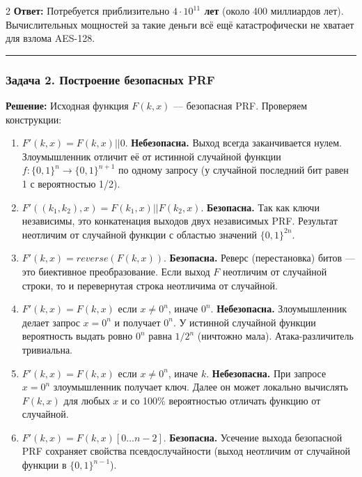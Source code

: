 ﻿\documentclass[10pt,a4paper,landscape]{extarticle}
\newcommand{\tightlist}{}
\begin{document}
\begin{multicols*}{2}
\textbf{Ответ:} Потребуется приблизительно \textbf{\(4 \cdot 10^{11}\) лет} (около 400 миллиардов лет). Вычислительных мощностей за такие деньги всё ещё катастрофически не хватает для взлома AES-128.

\begin{center}\rule{0.5\linewidth}{0.5pt}\end{center}

\subsubsection{Задача 2. Построение безопасных PRF}\label{ux437ux430ux434ux430ux447ux430-2.-ux43fux43eux441ux442ux440ux43eux435ux43dux438ux435-ux431ux435ux437ux43eux43fux430ux441ux43dux44bux445-prf}

\textbf{Решение:} Исходная функция \(F(k, x)\) --- безопасная PRF. Проверяем конструкции:

\begin{enumerate}
\def\labelenumi{\arabic{enumi}.}
\tightlist
\item
  \(F'(k, x) = F(k, x) || 0\). \textbf{Небезопасна.} Выход всегда заканчивается нулем. Злоумышленник отличит её от истинной случайной функции \(f: \{0,1\}^n \to \{0,1\}^{n+1}\) по одному запросу (у случайной последний бит равен 1 с вероятностью 1/2).
\item
  \(F'((k_1, k_2), x) = F(k_1, x) || F(k_2, x)\). \textbf{Безопасна.} Так как ключи независимы, это конкатенация выходов двух независимых PRF. Результат неотличим от случайной функции с областью значений \(\{0,1\}^{2n}\).
\item
  \(F'(k, x) = reverse(F(k, x))\). \textbf{Безопасна.} Реверс (перестановка) битов --- это биективное преобразование. Если выход \(F\) неотличим от случайной строки, то и перевернутая строка неотличима от случайной.
\item
  \(F'(k, x) = F(k, x)\) если \(x \neq 0^n\), иначе \(0^n\). \textbf{Небезопасна.} Злоумышленник делает запрос \(x = 0^n\) и получает \(0^n\). У истинной случайной функции вероятность выдать ровно \(0^n\) равна \(1/2^n\) (ничтожно мала). Атака-различитель тривиальна.
\item
  \(F'(k, x) = F(k, x)\) если \(x \neq 0^n\), иначе \(k\). \textbf{Небезопасна.} При запросе \(x = 0^n\) злоумышленник получает ключ. Далее он может локально вычислять \(F(k, x)\) для любых \(x\) и со 100\% вероятностью отличать функцию от случайной.
\item
  \(F'(k, x) = F(k, x)[0 \dots n-2]\). \textbf{Безопасна.} Усечение выхода безопасной PRF сохраняет свойства псевдослучайности (выход неотличим от случайной функции в \(\{0,1\}^{n-1}\)).
\end{enumerate}


\end{multicols*}
\end{document}

